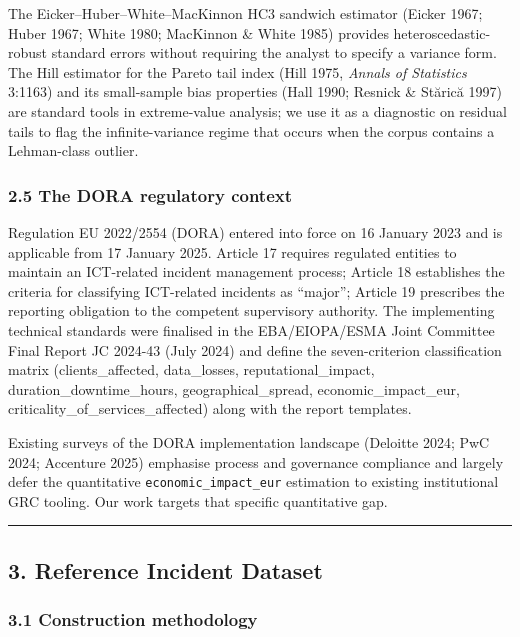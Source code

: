 \documentclass[
]{article}
\begin{document}
The Eicker--Huber--White--MacKinnon HC3 sandwich estimator (Eicker 1967;
Huber 1967; White 1980; MacKinnon \& White 1985) provides
heteroscedastic-robust standard errors without requiring the analyst to
specify a variance form. The Hill estimator for the Pareto tail index
(Hill 1975, \emph{Annals of Statistics} 3:1163) and its small-sample
bias properties (Hall 1990; Resnick \& Stărică 1997) are standard tools
in extreme-value analysis; we use it as a diagnostic on residual tails
to flag the infinite-variance regime that occurs when the corpus
contains a Lehman-class outlier.

\subsubsection{2.5 The DORA regulatory
context}\label{the-dora-regulatory-context}

Regulation EU 2022/2554 (DORA) entered into force on 16 January 2023 and
is applicable from 17 January 2025. Article 17 requires regulated
entities to maintain an ICT-related incident management process; Article
18 establishes the criteria for classifying ICT-related incidents as
``major''; Article 19 prescribes the reporting obligation to the
competent supervisory authority. The implementing technical standards
were finalised in the EBA/EIOPA/ESMA Joint Committee Final Report JC
2024-43 (July 2024) and define the seven-criterion classification matrix
(clients\_affected, data\_losses, reputational\_impact,
duration\_downtime\_hours, geographical\_spread, economic\_impact\_eur,
criticality\_of\_services\_affected) along with the report templates.

Existing surveys of the DORA implementation landscape (Deloitte 2024;
PwC 2024; Accenture 2025) emphasise process and governance compliance
and largely defer the quantitative \texttt{economic\_impact\_eur}
estimation to existing institutional GRC tooling. Our work targets that
specific quantitative gap.

\begin{center}\rule{0.5\linewidth}{0.5pt}\end{center}

\subsection{3. Reference Incident
Dataset}\label{reference-incident-dataset}

\subsubsection{3.1 Construction
methodology}\label{construction-methodology}
\end{document}
